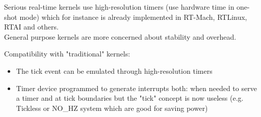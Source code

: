 Serious real-time kernels use high-resolution timers (use hardware time in one-shot mode) which for instance is already implemented in RT-Mach, RTLinux, RTAI and others.\\
General purpose kernels are more concerned about stability and overhead.

Compatibility with "traditional" kernels:
\begin{itemize}
    \item The tick event can be emulated through high-resolution timers
    \item Timer device programmed to generate interrupts both: when needed to serve a timer and at tick boundaries but the "tick" concept is now useless (e.g. Tickless or NO\_HZ system which are good for saving power)  
\end{itemize}